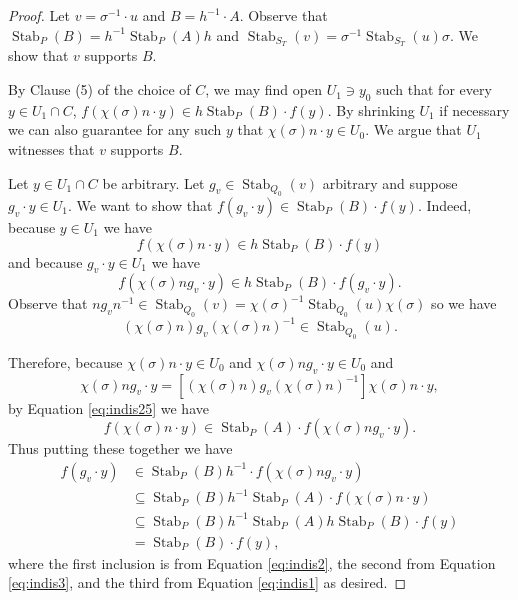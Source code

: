 \documentclass[12pt]{amsart}
\theoremstyle{plain}
\theoremstyle{definition}
\DeclareMathOperator{\Stab}{Stab}
\begin{document}
\begin{proof}
Let $v = \sigma^{-1} \cdot u$ and $B = h^{-1} \cdot A$. 
Observe that $\Stab_P(B) = h^{-1} \Stab_P(A) h$ and $\Stab_{S_T}(v) = \sigma^{-1} \Stab_{S_T}(u) \sigma$. 
We show that $v$ supports $B$. 

By Clause (5) of the choice of $C$, we may find open $U_1 \ni y_0$ such that for every $y \in U_1 \cap C$, $f(\chi(\sigma)n \cdot y) \in h \Stab_P(B) \cdot f(y)$.
By shrinking $U_1$ if necessary we can also guarantee for any such $y$ that $\chi(\sigma)n \cdot y \in U_0$.
We argue that $U_1$ witnesses that $v$ supports $B$.

Let $y \in U_1 \cap C$ be arbitrary. 
Let $g_v \in \Stab_{Q_0}(v)$ arbitrary and suppose $g_v \cdot y \in U_1$. 
We want to show that $f(g_v \cdot y) \in \Stab_P(B) \cdot f(y)$.
Indeed, because $y \in U_1$ we have
\begin{equation}\label{eq:indis1}
    f(\chi(\sigma)n \cdot y) \in h \Stab_P(B) \cdot f(y)
\end{equation}
and because $g_v \cdot y \in U_1$ we have
\begin{equation}\label{eq:indis2}
    f(\chi(\sigma)n g_v \cdot y) \in h \Stab_P(B) \cdot f(g_v \cdot y).
\end{equation}
Observe that $ng_vn^{-1} \in \Stab_{Q_0}(v) = \chi(\sigma)^{-1} \Stab_{Q_0}(u) \chi(\sigma)$ so we have
\begin{equation}\label{eq:indis25}
(\chi(\sigma)n) g_v (\chi(\sigma)n)^{-1} \in \Stab_{Q_0}(u).
\end{equation}

Therefore, because $\chi(\sigma)n \cdot y \in U_0$ and $\chi(\sigma)ng_v \cdot y \in U_0$ and 
\[\chi(\sigma)ng_v \cdot y = [(\chi(\sigma)n) g_v (\chi(\sigma)n)^{-1}] \chi(\sigma)n \cdot y,\]
by Equation \ref{eq:indis25} we have
\begin{equation}\label{eq:indis3}
    f(\chi(\sigma)n \cdot y) \in \Stab_P(A) \cdot f(\chi(\sigma)n g_v \cdot y).
\end{equation}
Thus putting these together we have
\begin{align*}
    f(g_v \cdot y) & \in \Stab_P(B) h^{-1} \cdot f(\chi(\sigma)n g_v \cdot y)\\
    & \subseteq \Stab_P(B) h^{-1} \Stab_P(A) \cdot f(\chi(\sigma)n \cdot y) \\
    & \subseteq \Stab_P(B) h^{-1} \Stab_P(A) h \Stab_P(B) \cdot f(y) \\
    & = \Stab_P(B) \cdot f(y),
\end{align*}
where the first inclusion is from Equation \ref{eq:indis2}, the second from Equation \ref{eq:indis3}, and the third from Equation \ref{eq:indis1} as desired.
\end{proof}
\end{document}
